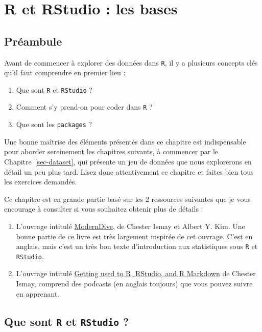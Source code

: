 \documentclass[
  a4paper,
  DIV=11,
  numbers=noendperiod,
  oneside]{scrreprt}
\providecommand{\tightlist}{%
  \setlength{\itemsep}{0pt}\setlength{\parskip}{0pt}}\usepackage{longtable,booktabs,array}
\begin{document}
\chapter{R et RStudio : les bases}\label{sec-basics}

\section{Préambule}\label{pruxe9ambule}

Avant de commencer à explorer des données dans \texttt{R}, il y a
plusieurs concepts clés qu'il faut comprendre en premier lieu :

\begin{enumerate}
\def\labelenumi{\arabic{enumi}.}
\tightlist
\item
  Que sont \texttt{R} et \texttt{RStudio} ?
\item
  Comment s'y prend-on pour coder dans \texttt{R} ?
\item
  Que sont les \texttt{packages} ?
\end{enumerate}

Une bonne maîtrise des éléments présentés dans ce chapitre est
indispensable pour aborder sereinement les chapitres suivants, à
commencer par le Chapitre~\ref{sec-dataset}, qui présente un jeu de
données que nous explorerons en détail un peu plus tard. Lisez donc
attentivement ce chapitre et faites bien tous les exercices demandés.

Ce chapitre est en grande partie basé sur les 2 ressources suivantes que
je vous encourage à consulter si vous souhaitez obtenir plus de détails
:

\begin{enumerate}
\def\labelenumi{\arabic{enumi}.}
\tightlist
\item
  L'ouvrage intitulé
  \href{https://moderndive.com/index.html}{ModernDive}, de Chester Ismay
  et Albert Y. Kim. Une bonne partie de ce livre est très largement
  inspirée de cet ouvrage. C'est en anglais, mais c'est un très bon
  texte d'introduction aux statistiques sous \texttt{R} et
  \texttt{RStudio}.
\item
  L'ouvrage intitulé
  \href{https://ismayc.github.io/rbasics-book/}{Getting used to R,
  RStudio, and R Markdown} de Chester Ismay, comprend des podcasts (en
  anglais toujours) que vous pouvez suivre en apprenant.
\end{enumerate}

\section{\texorpdfstring{Que sont \texttt{R} et \texttt{RStudio}
?}{Que sont R et RStudio ?}}\label{que-sont-r-et-rstudio}
\end{document}
